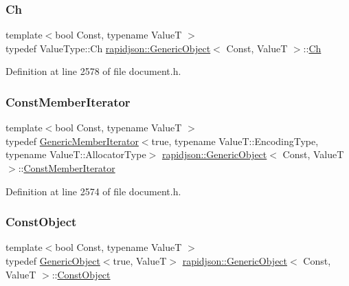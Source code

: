 \subsubsection{\texorpdfstring{Ch}{Ch}}
{\footnotesize\ttfamily template$<$bool Const, typename ValueT $>$ \\
typedef Value\+Type\+::\+Ch \mbox{\hyperlink{classrapidjson_1_1_generic_object}{rapidjson\+::\+Generic\+Object}}$<$ Const, ValueT $>$\+::\mbox{\hyperlink{classrapidjson_1_1_generic_object_a947f543afbdd5e6d1c5b2dd1fe5a6e60}{Ch}}}



Definition at line 2578 of file document.\+h.

\mbox{\label{classrapidjson_1_1_generic_object_a579a7d7ab7102bcf86c948d0df3d2f2d}} 
\subsubsection{\texorpdfstring{ConstMemberIterator}{ConstMemberIterator}}
{\footnotesize\ttfamily template$<$bool Const, typename ValueT $>$ \\
typedef \mbox{\hyperlink{classrapidjson_1_1_generic_member_iterator}{Generic\+Member\+Iterator}}$<$true, typename Value\+T\+::\+Encoding\+Type, typename Value\+T\+::\+Allocator\+Type$>$ \mbox{\hyperlink{classrapidjson_1_1_generic_object}{rapidjson\+::\+Generic\+Object}}$<$ Const, ValueT $>$\+::\mbox{\hyperlink{classrapidjson_1_1_generic_object_a579a7d7ab7102bcf86c948d0df3d2f2d}{Const\+Member\+Iterator}}}



Definition at line 2574 of file document.\+h.

\mbox{\label{classrapidjson_1_1_generic_object_a00d71a7ee4d903e74fdc5a83750dd0f7}} 
\subsubsection{\texorpdfstring{ConstObject}{ConstObject}}
{\footnotesize\ttfamily template$<$bool Const, typename ValueT $>$ \\
typedef \mbox{\hyperlink{classrapidjson_1_1_generic_object}{Generic\+Object}}$<$true, ValueT$>$ \mbox{\hyperlink{classrapidjson_1_1_generic_object}{rapidjson\+::\+Generic\+Object}}$<$ Const, ValueT $>$\+::\mbox{\hyperlink{classrapidjson_1_1_generic_object_a00d71a7ee4d903e74fdc5a83750dd0f7}{Const\+Object}}}



